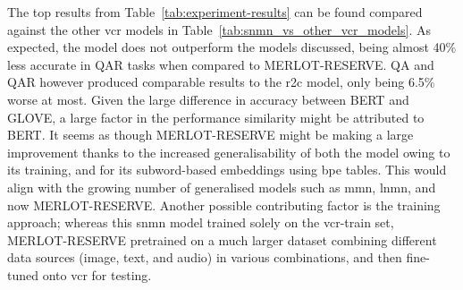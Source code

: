 The top results from Table~\ref{tab:experiment-results} can be found compared against the other \gls{vcr} models in Table~\ref{tab:snmn_vs_other_vcr_models}.
As expected, the model does not outperform the models discussed, being almost 40\% less accurate in Q\rightarrow{}AR tasks when compared to MERLOT-RESERVE.
Q\rightarrow{}A and QA\rightarrow{}R however produced comparable results to the \gls{r2c} model, only being 6.5\% worse at most.
Given the large difference in accuracy between BERT and GLOVE, a large factor in the performance similarity might be attributed to BERT.
It seems as though MERLOT-RESERVE might be making a large improvement thanks to the increased generalisability of both the model owing to its training, and for its subword-based embeddings using \gls{bpe} tables.
This would align with the growing number of generalised models such as \gls{mmn}, \gls{lnmn}, and now MERLOT-RESERVE.
Another possible contributing factor is the training approach; whereas this \gls{snmn} model trained solely on the \gls{vcr}-train set, MERLOT-RESERVE pretrained on a much larger dataset combining different data sources (image, text, and audio) in various combinations, and then fine-tuned onto \gls{vcr} for testing.
